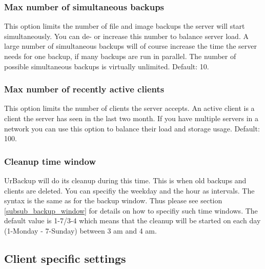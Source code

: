 \documentclass[a4paper,10pt]{article}
\begin{document}
\subsubsection{Max number of simultaneous backups}

This option limits the number of file and image backups the server will start simultaneously. You can de- or increase this number to balance server load. A large number of simultaneous backups will of course increase the time the server needs for one backup, if many backups are run in parallel. The number of possible simultaneous backups is virtually unlimited. Default: 10.

\subsubsection{Max number of recently active clients}

This option limits the number of clients the server accepts. An active client is a client the server has seen in the last two month. If you have multiple servers in a network you can use this option to balance their load and storage usage. Default: 100.

\subsubsection{Cleanup time window}

UrBackup will do its cleanup during this time. This is when old backups and clients are deleted. You can specifiy the weekday and the hour as intervals. The syntax is the same as for the backup window. Thus please see section \ref{subsub_backup_window} for details on how to specifiy such time windows.
The default value is 1-7/3-4 which means that the cleanup will be started on each day (1-Monday - 7-Sunday) between 3 am and 4 am.

\subsection{Client specific settings}
\end{document}
